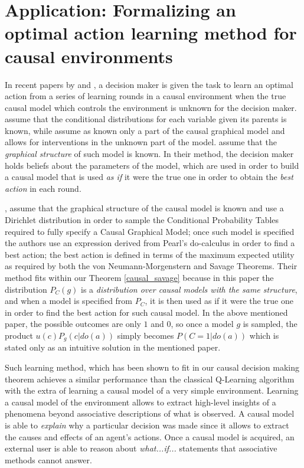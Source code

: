 \documentclass{svjour3}                     %
\begin{document}
\section{Application: Formalizing an optimal action learning method for causal environments}
\label{optimal_action}
In recent papers by \cite{lattimoreNIPS2016,sen2017identifying} and \cite{gonzalez2018playing}, a decision maker is given the task to learn an optimal action from a series of learning rounds in a causal environment when the true causal model which controls the environment is unknown for the decision maker. \cite{lattimoreNIPS2016} assume that the conditional distributions for each variable given its parents is known, while \cite{sen2017identifying} assume as known only a part of the causal graphical model and allows for interventions in the unknown part of the model. \cite{gonzalez2018playing}  assume that the \textit{graphical structure} of such model is known. In their method, the decision maker holds beliefs about the parameters of the model, which are used in order to build a causal model that is used \textit{as if} it were the true one in order to obtain the \textit{best action} in each round.

\cite{gonzalez2018playing}, assume that the graphical structure of the causal model is known and use a Dirichlet distribution in order to sample the Conditional Probability Tables required to fully specify a Causal Graphical Model; once such model is specified the authors use an expression derived from Pearl's do-calculus in order to find a best action; the best action is defined in terms of the maximum expected utility as required by both the von Neumann-Morgenstern and Savage Theorems. Their method fits within our Theorem \ref{causal_savage} because in this paper the distribution $P_C(g)$ is a \textit{distribution over causal models with the same structure}, and when a model is specified from $P_C$, it is then used as if it were the true one in order to find the best action for such causal model. In the above mentioned paper, the possible outcomes are only $1$ and $0$, so once a model $g$ is sampled, the product $u(c)P_g(c|do(a))$ simply becomes $P(C=1 | do(a))$ which is stated only as an intuitive solution in the mentioned paper. 

Such learning method, which has been shown to fit in our causal decision making theorem achieves a similar performance than the classical Q-Learning algorithm with the extra of learning a causal model of a very simple environment. Learning a causal model of the environment allows to extract high-level insights of a phenomena beyond associative descriptions of what is observed. A causal model is able to \textit{explain} why a particular decision was made since it allows to extract the causes and effects of an agent's actions. Once a causal model is acquired, an external user is able to reason about \textit{what...if...} statements that associative methods cannot answer.  
\end{document}
